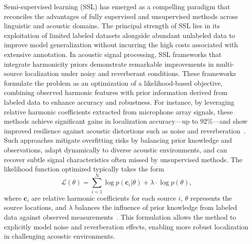 \documentclass[sigconf]{acmart}
\begin{document}
Semi-supervised learning (SSL) has emerged as a compelling paradigm that reconciles the advantages of fully supervised and unsupervised methods across linguistic and acoustic domains. The principal strength of SSL lies in its exploitation of limited labeled datasets alongside abundant unlabeled data to improve model generalization without incurring the high costs associated with extensive annotation. In acoustic signal processing, SSL frameworks that integrate harmonicity priors demonstrate remarkable improvements in multi-source localization under noisy and reverberant conditions. These frameworks formulate the problem as an optimization of a likelihood-based objective, combining observed harmonic features with prior information derived from labeled data to enhance accuracy and robustness. For instance, by leveraging relative harmonic coefficients extracted from microphone array signals, these methods achieve significant gains in localization accuracy—up to 92\%—and show improved resilience against acoustic distortions such as noise and reverberation~\cite{ref52}. Such approaches mitigate overfitting risks by balancing prior knowledge and observations, adapt dynamically to diverse acoustic environments, and can recover subtle signal characteristics often missed by unsupervised methods. The likelihood function optimized typically takes the form
\[
\mathcal{L}(\theta) = \sum_{i=1}^N \log p(\mathbf{c}_i | \theta) + \lambda \cdot \log p(\theta),
\]
where $\mathbf{c}_i$ are relative harmonic coefficients for each source $i$, $\theta$ represents the source locations, and $\lambda$ balances the influence of prior knowledge from labeled data against observed measurements~\cite{ref52}. This formulation allows the method to explicitly model noise and reverberation effects, enabling more robust localization in challenging acoustic environments.
\end{document}
